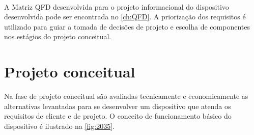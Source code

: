 \begin{table}[H]
    \caption{Prioridade dos requisitos definidos pela matriz QFD}
    \label{tab:resultqfd}
    \centering
\
\end{table}

A Matriz QFD desenvolvida para o projeto informacional do dispositivo desenvolvida pode ser encontrada no \autoref{ch:QFD}.
A priorização dos requisitos é utilizado para guiar a tomada de decisões de projeto e escolha de componentes nos estágios do projeto conceitual.

\section{Projeto conceitual}

Na fase de projeto conceitual são avaliadas tecnicamente e economicamente as alternativas levantadas para se desenvolver um dispositivo que atenda os requisitos de cliente e de projeto.
O conceito de funcionamento básico do dispositivo é ilustrado na \autoref{fig:2035}.

